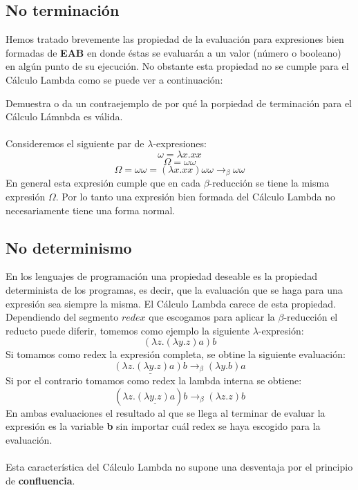                 \subsection{No terminación}
                    Hemos tratado brevemente las propiedad de la evaluación para expresiones bien formadas de \textbf{EAB} en donde éstas se evaluarán a un valor (número o booleano) en algún punto de su ejecución. 
                    No obstante esta propiedad no se cumple para el Cálculo Lambda como se puede ver a continuación:
                    \begin{exercise}
                        Demuestra o da un contraejemplo de por qué la porpiedad de terminación para el Cálculo Lámnbda es válida.\\\\
                        Consideremos el siguiente par de $\lambda$-expresiones:\\
                        $$ \omega = \lambda x.xx$$
                        $$ \Omega = \omega \omega$$
                        $$ \Omega = \omega \omega = (\lambda x.xx) \omega \omega \rightarrow_\beta \omega \omega$$
                        En general esta expresión cumple que en cada $\beta$-reducción se tiene la misma expresión $\Omega$.
                        Por lo tanto una expresión bien formada del Cálculo Lambda no necesariamente tiene una forma normal.
                    \end{exercise}

                \subsection{No determinismo}
                    En los lenguajes de programación una propiedad deseable es la propiedad determinista de los programas, es decir, que la evaluación que se haga para una expresión sea siempre la misma. El Cálculo Lambda carece de esta propiedad. Dependiendo del segmento $redex$ que escogamos para aplicar la $\beta$-reducción el reducto puede diferir, tomemos como ejemplo la siguiente $\lambda$-expresión:
                    $$(\lambda z.(\lambda y.z)a)b$$
                    Si tomamos como redex la expresión completa, se obtine la siguiente evaluación: $$\underline{(\lambda z.(\lambda y.z)a)b} \rightarrow_\beta (\lambda y.b)a$$
                    Si por el contrario tomamos como redex la lambda interna se obtiene: $$(\lambda z.\underline{(\lambda y.z)a})b \rightarrow_\beta (\lambda z.z)b$$
                    En ambas evaluaciones el resultado al que se llega al terminar de evaluar la expresión es la variable \textbf{b} sin importar cuál redex se haya escogido para la evaluación.\\\\
                    Esta característica del Cálculo Lambda no supone una desventaja por el principio de \textbf{confluencia}.

